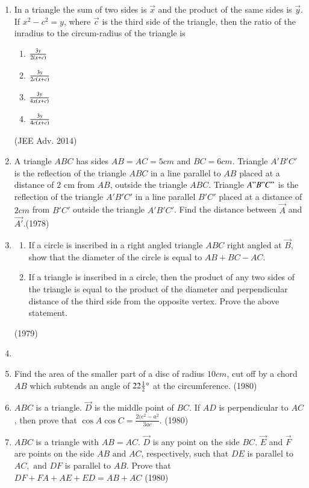 \begin{enumerate}[label=\thesubsection.\arabic*,ref=\thesubsection.\theenumi]
\item In a triangle the sum of two sides is $\vec{x}$ and the product of the same sides is $\vec{y}$. If $x^2-c^2=y$, where $\vec{c}$ is the third side of the triangle, then the ratio of the inradius to the circum-radius of the triangle is
\begin{enumerate}
\item $\frac{3y}{2\left(x+c\right)}$
\item $\frac{3y}{2c\left(x+c\right)}$
\item $\frac{3y}{4x\left(x+c\right)}$
\item $\frac{3y}{4c\left(x+c\right)}$
\end{enumerate}
\hfill (JEE Adv. 2014)
     \item A triangle $ABC$ has sides $AB=AC=5 cm$ and $BC =6 cm$. Triangle $A'B'C'$ is the reflection of the triangle $ABC$ in a line parallel to $AB$ placed at a distance of $2$ cm from $AB$, outside the triangle $ABC$. Triangle $A"B"C"$ is the reflection of the triangle $A'B'C'$ in a line parallel $B'C'$ placed at a distance of $2 cm$ from $B'C'$ outside the triangle $A'B'C'$. Find the distance between $\vec{A}$ and $\vec{A'}$.\hfill {(1978)}
     \item 
     \begin{enumerate}
     	\item If a circle is inscribed in a right angled triangle $ABC$ right angled at $\vec{B}$, show that the diameter of the circle is equal to $AB+BC-AC$.
     	\item If a triangle is inscribed in a circle, then the product of any two sides of the triangle is equal to the product of the diameter and perpendicular distance of the third side from the opposite vertex. Prove the above statement.
     \end{enumerate}
     \hfill {(1979)}
     \item
     	\item Find the area of the smaller part of a disc of radius $10 cm$, cut off by a chord $AB$ which subtends an angle of $22\frac{1}{2} \degree$ at the circumference.
     \hfill {(1980)}
     \item $ABC$ is a triangle. $\vec{D}$ is the middle point of $BC$. If $AD$ is perpendicular to $AC$, then prove that $\cos{A}\cos{C} = \frac{2(c^{2}-a^{2}}{3ac}$.
     \hfill {(1980)}
     \item $ABC$ is a triangle with $AB=AC$. $\vec{D}$ is any point on the side $BC$. $\vec{E}$ and $\vec{F}$ are points on the side $AB \text{ and } AC$, respectively, such that $DE$ is parallel to $AC, \text{ and } DF$ is parallel to $AB$. Prove that \\
     $DF + FA + AE + ED = AB+AC$
     \hfill {(1980)} 


\end{enumerate}
